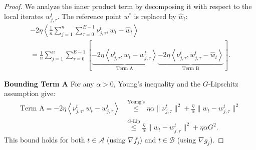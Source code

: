 \documentclass{article} %
\begin{document}
\begin{proof}
    We analyze the inner product term by decomposing it with respect to the local iterates $w_{j,\tau}^t$. The reference point $w^*$ is replaced by $\hat{w}_t$:
    \begin{gather*}
    -2\eta \left\langle \frac{1}{n} \sum_{j=1}^n \sum_{\tau=0}^{E-1} \nu_{j,\tau}^t, w_t - \hat{w}_t \right\rangle \\
    = \frac{1}{n} \sum_{j=1}^n \sum_{\tau=0}^{E-1} \left[\underbrace{-2\eta\left\langle \nu_{j,\tau}^t, w_t - w_{j,\tau}^t \right\rangle}_{\text{Term A}} \underbrace{-2\eta\left\langle \nu_{j,\tau}^t, w_{j,\tau}^t - \hat{w}_t \right\rangle}_{\text{Term B}}\right].
    \end{gather*}

    \textbf{Bounding Term A}
    For any $\alpha > 0$, Young's inequality and the $G$-Lipschitz assumption give:
    \begin{align*}
        \text{Term A} = -2\eta \left\langle \nu_{j,\tau}^t, w_t - w_{j,\tau}^t \right\rangle &\overset{\text{Young's}}{\leq} \eta\alpha \|\nu_{j,\tau}^t\|^2 + \frac{\eta}{\alpha} \| w_t - w_{j,\tau}^t \|^2
        \\
        &\overset{G\text{-Lip}}{\leq} \frac{\eta}{\alpha} \| w_t - w_{j,\tau}^t \|^2 + \eta \alpha G^2.
    \end{align*}
    This bound holds for both $t \in \mathcal{A}$ (using $\nabla f_j$) and $t \in \mathcal{B}$ (using $\nabla g_j$).


\end{proof}
\end{document}
